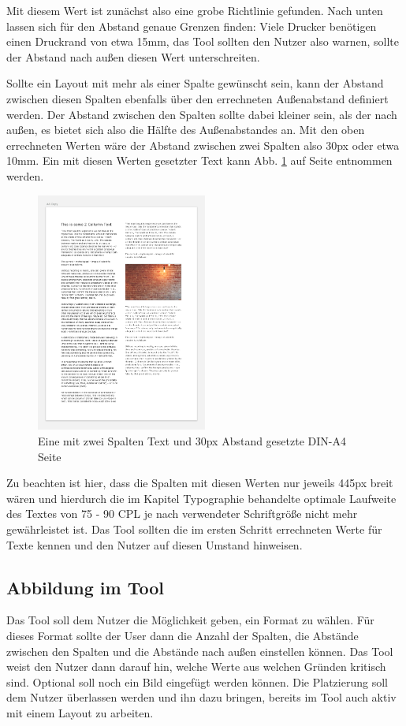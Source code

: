 Mit diesem Wert ist zunächst also eine grobe Richtlinie gefunden. Nach unten lassen sich für den Abstand genaue Grenzen finden: Viele Drucker benötigen einen Druckrand von etwa 15mm, das Tool sollten den Nutzer also warnen, sollte der Abstand nach außen diesen Wert unterschreiten.

Sollte ein Layout mit mehr als einer Spalte gewünscht sein, kann der Abstand zwischen diesen Spalten ebenfalls über den errechneten Außenabstand definiert werden. Der Abstand zwischen den Spalten sollte dabei kleiner sein, als der nach außen, es bietet sich also die Hälfte des Außenabstandes an. Mit den oben errechneten Werten wäre der Abstand zwischen zwei Spalten also 30px oder etwa 10mm. Ein mit diesen Werten gesetzter Text kann Abb. \ref{fig:a4-two-col} auf Seite \pageref{fig:a4-two-col} entnommen werden.

\begin{figure}[h]
    \centering
    \includegraphics[width=0.5\textwidth]{images/A4-two-col.png}
    \caption{Eine mit zwei Spalten Text und 30px Abstand gesetzte DIN-A4 Seite}
    \label{fig:a4-two-col}
\end{figure}

Zu beachten ist hier, dass die Spalten mit diesen Werten nur jeweils 445px breit wären und hierdurch die im Kapitel Typographie behandelte optimale Laufweite des Textes von 75 - 90 CPL je nach verwendeter Schriftgröße nicht mehr gewährleistet ist. Das Tool sollten die im ersten Schritt errechneten Werte für Texte kennen und den Nutzer auf diesen Umstand hinweisen.

\subsection{Abbildung im Tool}
Das Tool soll dem Nutzer die Möglichkeit geben, ein Format zu wählen. Für dieses Format sollte der User dann die Anzahl der Spalten, die Abstände zwischen den Spalten und die Abstände nach außen einstellen können.
Das Tool weist den Nutzer dann darauf hin, welche Werte aus welchen Gründen kritisch sind.
Optional soll noch ein Bild eingefügt werden können. Die Platzierung soll dem Nutzer überlassen werden und ihn dazu bringen, bereits im Tool auch aktiv mit einem Layout zu arbeiten.

